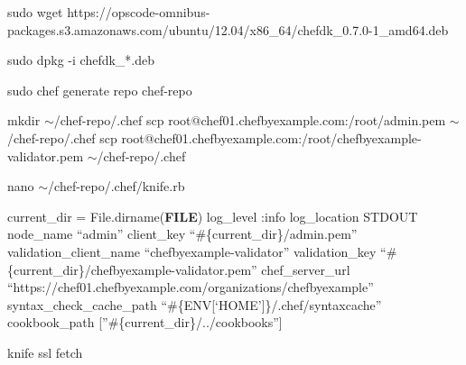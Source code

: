 sudo wget https://opscode-omnibus-packages.s3.amazonaws.com/ubuntu/12.04/x86\_64/chefdk\_0.7.0-1\_amd64.deb

sudo dpkg -i chefdk\_*.deb

sudo chef generate repo chef-repo

mkdir \ensuremath{\sim}/chef-repo/.chef
scp root@chef01.chefbyexample.com:/root/admin.pem \ensuremath{\sim}/chef-repo/.chef
scp root@chef01.chefbyexample.com:/root/chefbyexample-validator.pem \ensuremath{\sim}/chef-repo/.chef

nano \ensuremath{\sim}/chef-repo/.chef/knife.rb

current\_dir = File.dirname(\textbf{FILE})
log\_level                :info
log\_location             STDOUT
node\_name                ``admin''
client\_key               ``\#\{current\_dir\}/admin.pem''
validation\_client\_name   ``chefbyexample-validator''
validation\_key           ``\#\{current\_dir\}/chefbyexample-validator.pem''
chef\_server\_url          ``https://chef01.chefbyexample.com/organizations/chefbyexample''
syntax\_check\_cache\_path  ``\#\{ENV[`HOME']\}/.chef/syntaxcache''
cookbook\_path            [''\#\{current\_dir\}/../cookbooks'']

knife ssl fetch